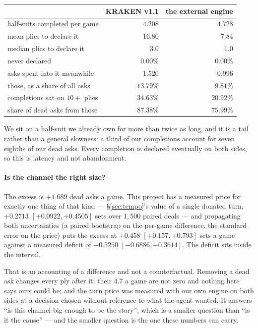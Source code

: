 \documentclass[11pt,letterpaper]{article}
\begin{document}
\begin{center}
\small
\begin{tabular}{lrr}
\toprule
 & KRAKEN v1.1 & the external engine \\
\midrule
half-suits completed per game & $4.208$ & $4.728$ \\
mean plies to declare it & $\mathbf{16.80}$ & $\mathbf{7.84}$ \\
median plies to declare it & $3.0$ & $1.0$ \\
never declared & $0.00\%$ & $0.00\%$ \\
asks spent into it meanwhile & $1.520$ & $0.996$ \\
those, as a share of all asks & $13.79\%$ & $9.81\%$ \\
completions sat on $10+$ plies & $34.63\%$ & $20.92\%$ \\
share of dead asks from those & $87.38\%$ & $75.99\%$ \\
\bottomrule
\end{tabular}
\end{center}

\noindent We sit on a half-suit we already own for more than twice as long, and
it is a tail rather than a general slowness: a third of our completions account
for seven eighths of our dead asks. Every completion is declared eventually on
both sides, so this is latency and not abandonment.

\paragraph{Is the channel the right size?} The excess is $+1.689$ dead asks a
game. This project has a measured price for exactly one thing of that kind ---
\S\ref{sec:tempo}'s value of a single donated turn, $+0.2713$ $[+0.0922,
+0.4505]$ sets over $1{,}500$ paired deals --- and propagating both
uncertainties (a paired bootstrap on the per-game difference, the standard
error on the price) puts the excess at $\mathbf{+0.458}$ $[+0.157, +0.793]$
sets a game against a measured deficit of $-0.5250$ $[-0.6886, -0.3614]$. The
deficit sits inside the interval.

That is an accounting of a difference and not a counterfactual. Removing a dead
ask changes every ply after it; their $4.7$ a game are not zero and nothing
here says ours could be; and the turn price was measured with our own engine on
both sides at a decision chosen without reference to what the agent wanted. It
answers ``is this channel big enough to be the story'', which is a smaller
question than ``is it the cause'' --- and the smaller question is the one these
numbers can carry.
\end{document}
